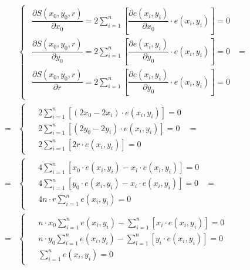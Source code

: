 \begin{align}
    \nonumber
    &\begin{cases}
         \begin{aligned}
             \dfrac{\partial S(x_0, y_0, r)}{\partial x_0} = 2 \sum_{i=1}^{n} \left[
             \dfrac{\partial e(x_i, y_i)}{\partial x_0} \cdot e(x_i, y_i) \right] = 0 \\
             \dfrac{\partial S(x_0, y_0, r)}{\partial y_0} = 2 \sum_{i=1}^{n} \left[
             \dfrac{\partial e(x_i, y_i)}{\partial y_0} \cdot e(x_i, y_i)\right] = 0 \\
             \dfrac{\partial S(x_0, y_0, r)}{\partial r} = 2 \sum_{i=1}^{n} \left[
             \dfrac{\partial e(x_i, y_i)}{\partial y_0} \cdot e(x_i, y_i)\right] = 0
         \end{aligned}
    \end{cases} = \\ \nonumber
    = &\begin{cases}
           \begin{aligned}
               &2 \sum_{i=1}^{n} \left[ (2 x_0 - 2 x_i) \cdot e(x_i, y_i) \right] = 0 \\
               &2 \sum_{i=1}^{n} \left[ (2 y_0 - 2 y_i) \cdot e(x_i, y_i) \right] = 0 \\
               &2 \sum_{i=1}^{n} \left[ 2 r \cdot e(x_i, y_i) \right] = 0
           \end{aligned}
    \end{cases} = \\ \nonumber
    = &\begin{cases}
           \begin{aligned}
               &4 \sum_{i=1}^{n} \left[ x_0 \cdot e(x_i, y_i) - x_i \cdot e(x_i, y_i) \right] = 0 \\
               &4 \sum_{i=1}^{n} \left[ y_0 \cdot e(x_i, y_i) - x_i \cdot e(x_i, y_i) \right] = 0 \\
               &4 n \cdot r \sum_{i=1}^{n} e(x_i, y_i) = 0
           \end{aligned}
    \end{cases} = \\
    = &\begin{cases}
           \label{eq:FindDetail:Circle_MNK_system}
           \begin{aligned}
               &n \cdot x_0 \sum_{i=1}^{n} e(x_i, y_i)
               - \sum_{i=1}^{n} \left[ x_i \cdot e(x_i, y_i) \right] = 0 \\
               &n \cdot y_0 \sum_{i=1}^{n} e(x_i, y_i)
               - \sum_{i=1}^{n} \left[ y_i \cdot e(x_i, y_i) \right] = 0 \\
               &\sum_{i=1}^{n} e(x_i, y_i) = 0
           \end{aligned}
    \end{cases}
\end{align} \\

